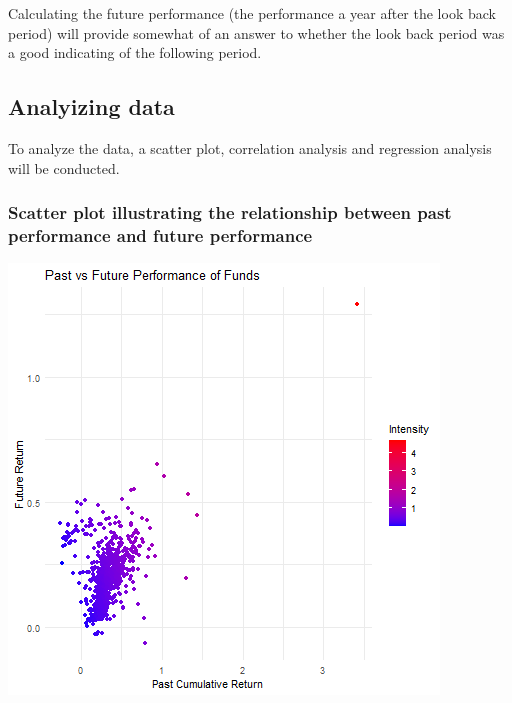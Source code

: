 \documentclass[11pt,preprint, authoryear]{elsarticle}
\let\origfigure\figure
\let\endorigfigure\endfigure
\renewenvironment{figure}[1][2] {
    \expandafter\origfigure\expandafter[H]
} {
    \endorigfigure
}
\numberwithin{equation}{section}
\numberwithin{figure}{section}
\numberwithin{table}{section}
\begin{document}
Calculating the future performance (the performance a year after the
look back period) will provide somewhat of an answer to whether the look
back period was a good indicating of the following period.

\hypertarget{analyizing-data}{%
\subsection{Analyizing data}\label{analyizing-data}}

To analyze the data, a scatter plot, correlation analysis and regression
analysis will be conducted.

\hypertarget{scatter-plot-illustrating-the-relationship-between-past-performance-and-future-performance}{%
\subsubsection{Scatter plot illustrating the relationship between past
performance and future
performance}\label{scatter-plot-illustrating-the-relationship-between-past-performance-and-future-performance}}

\begin{figure}[H]

{\centering \includegraphics{Question-4_files/figure-latex/Figure 1-1} 

}

\caption{3 year look back scatter plot \label{Figure1}}\label{fig:Figure 1}
\end{figure}
\end{document}
